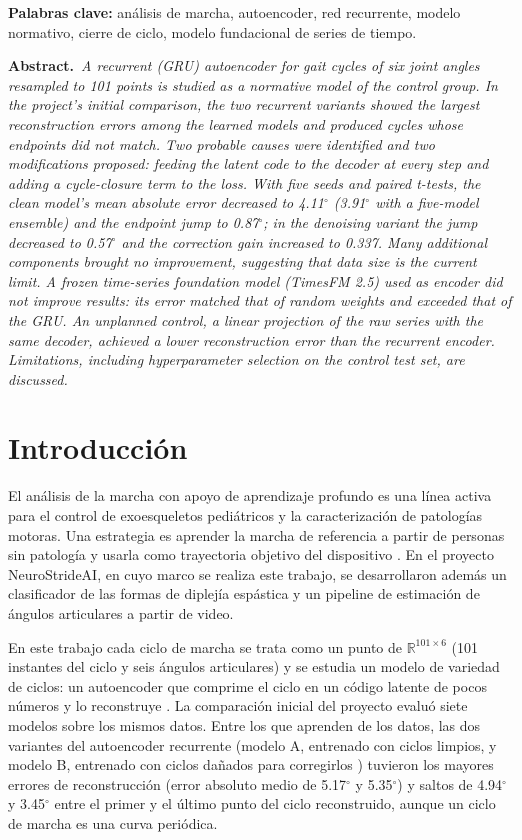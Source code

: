 \documentclass[11pt,a4paper]{amsart}
\newcommand{\gr}{$^{\circ}$}
\newcommand{\R}{\mathbb{R}}
\begin{document}
\noindent\textbf{Palabras clave:} análisis de marcha, autoencoder, red recurrente, modelo normativo, cierre de ciclo, modelo fundacional de series de tiempo.

\medskip
\noindent\textbf{Abstract.}\ \textit{A recurrent (GRU) autoencoder for gait cycles of six joint angles resampled to 101 points is studied as a normative model of the control group. In the project's initial comparison, the two recurrent variants showed the largest reconstruction errors among the learned models and produced cycles whose endpoints did not match. Two probable causes were identified and two modifications proposed: feeding the latent code to the decoder at every step and adding a cycle-closure term to the loss. With five seeds and paired t-tests, the clean model's mean absolute error decreased to 4.11\gr{} (3.91\gr{} with a five-model ensemble) and the endpoint jump to 0.87\gr{}; in the denoising variant the jump decreased to 0.57\gr{} and the correction gain increased to 0.337. Many additional components brought no improvement, suggesting that data size is the current limit. A frozen time-series foundation model (TimesFM 2.5) used as encoder did not improve results: its error matched that of random weights and exceeded that of the GRU. An unplanned control, a linear projection of the raw series with the same decoder, achieved a lower reconstruction error than the recurrent encoder. Limitations, including hyperparameter selection on the control test set, are discussed.}

\section{Introducción}

El análisis de la marcha con apoyo de aprendizaje profundo es una línea activa para el control de exoesqueletos pediátricos y la caracterización de patologías motoras. Una estrategia es aprender la marcha de referencia a partir de personas sin patología y usarla como trayectoria objetivo del dispositivo \cite{kolaghassi2023}. En el proyecto NeuroStrideAI, en cuyo marco se realiza este trabajo, se desarrollaron además un clasificador de las formas de diplejía espástica \cite{ferrari2019} y un pipeline de estimación de ángulos articulares a partir de video.

En este trabajo cada ciclo de marcha se trata como un punto de $\R^{101\times 6}$ (101 instantes del ciclo y seis ángulos articulares) y se estudia un modelo de variedad de ciclos: un autoencoder que comprime el ciclo en un código latente de pocos números y lo reconstruye \cite{hinton2006}. La comparación inicial del proyecto \cite{neurostride2026} evaluó siete modelos sobre los mismos datos. Entre los que aprenden de los datos, las dos variantes del autoencoder recurrente (modelo A, entrenado con ciclos limpios, y modelo B, entrenado con ciclos dañados para corregirlos \cite{vincent2008}) tuvieron los mayores errores de reconstrucción (error absoluto medio de 5.17\gr{} y 5.35\gr{}) y saltos de 4.94\gr{} y 3.45\gr{} entre el primer y el último punto del ciclo reconstruido, aunque un ciclo de marcha es una curva periódica.
\end{document}
